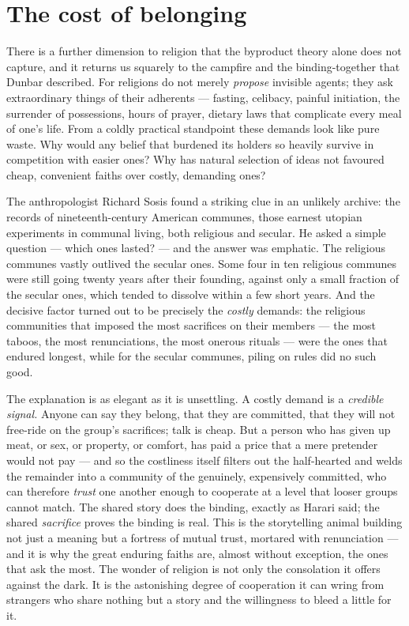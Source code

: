 \section*{The cost of belonging}

There is a further dimension to religion that the byproduct theory alone does not capture, and it returns us squarely to the campfire and the binding-together that Dunbar described. For religions do not merely \emph{propose} invisible agents; they ask extraordinary things of their adherents — fasting, celibacy, painful initiation, the surrender of possessions, hours of prayer, dietary laws that complicate every meal of one's life. From a coldly practical standpoint these demands look like pure waste. Why would any belief that burdened its holders so heavily survive in competition with easier ones? Why has natural selection of ideas not favoured cheap, convenient faiths over costly, demanding ones?

The anthropologist Richard Sosis found a striking clue in an unlikely archive: the records of nineteenth-century American communes, those earnest utopian experiments in communal living, both religious and secular. He asked a simple question — which ones lasted? — and the answer was emphatic. The religious communes vastly outlived the secular ones. Some four in ten religious communes were still going twenty years after their founding, against only a small fraction of the secular ones, which tended to dissolve within a few short years. And the decisive factor turned out to be precisely the \emph{costly} demands: the religious communities that imposed the most sacrifices on their members — the most taboos, the most renunciations, the most onerous rituals — were the ones that endured longest, while for the secular communes, piling on rules did no such good.

The explanation is as elegant as it is unsettling. A costly demand is a \emph{credible signal.} Anyone can say they belong, that they are committed, that they will not free-ride on the group's sacrifices; talk is cheap. But a person who has given up meat, or sex, or property, or comfort, has paid a price that a mere pretender would not pay — and so the costliness itself filters out the half-hearted and welds the remainder into a community of the genuinely, expensively committed, who can therefore \emph{trust} one another enough to cooperate at a level that looser groups cannot match. The shared story does the binding, exactly as Harari said; the shared \emph{sacrifice} proves the binding is real. This is the storytelling animal building not just a meaning but a fortress of mutual trust, mortared with renunciation — and it is why the great enduring faiths are, almost without exception, the ones that ask the most. The wonder of religion is not only the consolation it offers against the dark. It is the astonishing degree of cooperation it can wring from strangers who share nothing but a story and the willingness to bleed a little for it.

